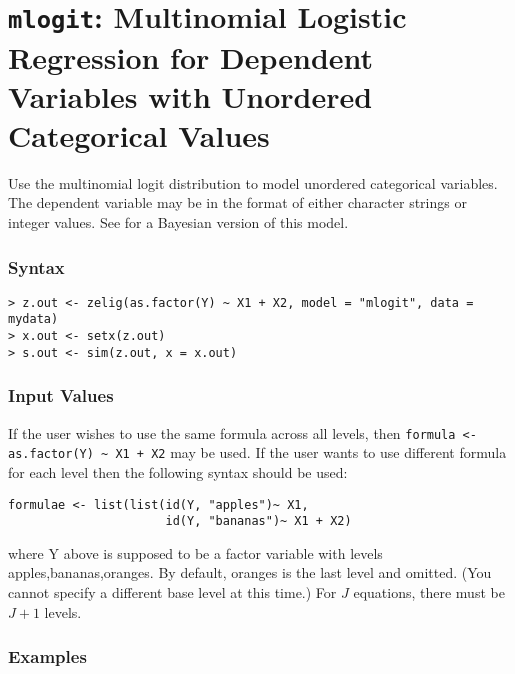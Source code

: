 \section{{\tt mlogit}: Multinomial Logistic Regression for
Dependent Variables with Unordered Categorical Values}\label{mlogit}

Use the multinomial logit distribution to model unordered categorical
variables.  The dependent variable may be in the format of either
character strings or integer values.  See  for a
Bayesian version of this model.  

\subsubsection{Syntax}

\begin{verbatim}
> z.out <- zelig(as.factor(Y) ~ X1 + X2, model = "mlogit", data = mydata)
> x.out <- setx(z.out)
> s.out <- sim(z.out, x = x.out)
\end{verbatim}

\subsubsection{Input Values}

If the user wishes to use the same formula across all levels, then 
\verb|formula <- as.factor(Y) ~ X1 + X2| may be used. 
If the user wants to use different formula for each level then the following 
syntax should be used:
\begin{verbatim}
formulae <- list(list(id(Y, "apples")~ X1, 
                      id(Y, "bananas")~ X1 + X2)
\end{verbatim}
where Y above is supposed to be a factor variable with levels {apples,bananas,oranges}.  
By default, oranges is the last level and omitted.  (You cannot
specify a different base level at this time.)  
For $J$ equations, there must be $J + 1$ levels.
 
\subsubsection{Examples} \label{ternary}

